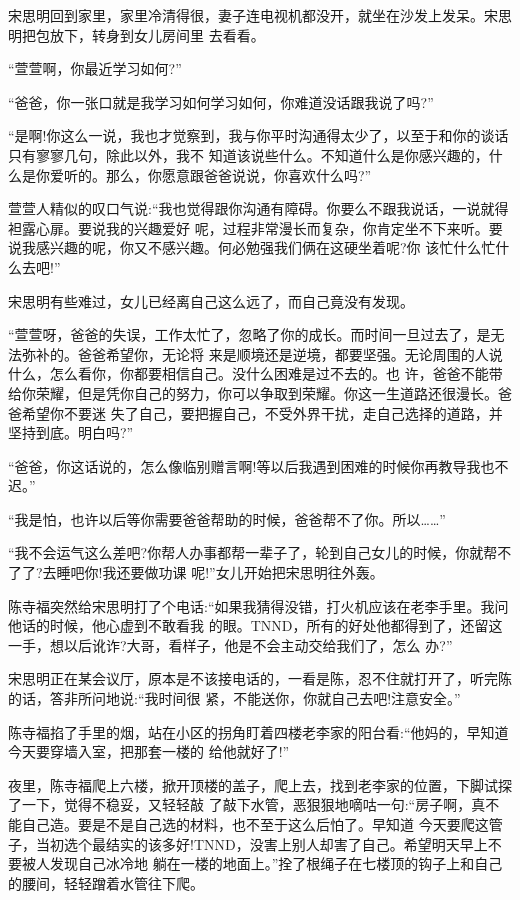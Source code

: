 \documentclass[11pt,a4paper,onecolumn]{article}
\begin{document}
宋思明回到家里，家里冷清得很，妻子连电视机都没开，就坐在沙发上发呆。宋思明把包放下，转身到女儿房间里
去看看。

``萱萱啊，你最近学习如何?''

``爸爸，你一张口就是我学习如何学习如何，你难道没话跟我说了吗?''

``是啊!你这么一说，我也才觉察到，我与你平时沟通得太少了，以至于和你的谈话只有寥寥几句，除此以外，我不
知道该说些什么。不知道什么是你感兴趣的，什么是你爱听的。那么，你愿意跟爸爸说说，你喜欢什么吗?''

萱萱人精似的叹口气说:``我也觉得跟你沟通有障碍。你要么不跟我说话，一说就得袒露心扉。要说我的兴趣爱好
呢，过程非常漫长而复杂，你肯定坐不下来听。要说我感兴趣的呢，你又不感兴趣。何必勉强我们俩在这硬坐着呢?你
该忙什么忙什么去吧!''

宋思明有些难过，女儿已经离自己这么远了，而自己竟没有发现。

``萱萱呀，爸爸的失误，工作太忙了，忽略了你的成长。而时间一旦过去了，是无法弥补的。爸爸希望你，无论将
来是顺境还是逆境，都要坚强。无论周围的人说什么，怎么看你，你都要相信自己。没什么困难是过不去的。也
许，爸爸不能带给你荣耀，但是凭你自己的努力，你可以争取到荣耀。你这一生道路还很漫长。爸爸希望你不要迷
失了自己，要把握自己，不受外界干扰，走自己选择的道路，并坚持到底。明白吗?''

``爸爸，你这话说的，怎么像临别赠言啊!等以后我遇到困难的时候你再教导我也不迟。''

``我是怕，也许以后等你需要爸爸帮助的时候，爸爸帮不了你。所以……''

``我不会运气这么差吧?你帮人办事都帮一辈子了，轮到自己女儿的时候，你就帮不了了?去睡吧你!我还要做功课
呢!''女儿开始把宋思明往外轰。

陈寺福突然给宋思明打了个电话:``如果我猜得没错，打火机应该在老李手里。我问他话的时候，他心虚到不敢看我
的眼。TNND，所有的好处他都得到了，还留这一手，想以后讹诈?大哥，看样子，他是不会主动交给我们了，怎么
办?''

宋思明正在某会议厅，原本是不该接电话的，一看是陈，忍不住就打开了，听完陈的话，答非所问地说:``我时间很
紧，不能送你，你就自己去吧!注意安全。''

陈寺福掐了手里的烟，站在小区的拐角盯着四楼老李家的阳台看:``他妈的，早知道今天要穿墙入室，把那套一楼的
给他就好了!''

夜里，陈寺福爬上六楼，掀开顶楼的盖子，爬上去，找到老李家的位置，下脚试探了一下，觉得不稳妥，又轻轻敲
了敲下水管，恶狠狠地嘀咕一句:``房子啊，真不能自己造。要是不是自己选的材料，也不至于这么后怕了。早知道
今天要爬这管子，当初选个最结实的该多好!TNND，没害上别人却害了自己。希望明天早上不要被人发现自己冰冷地
躺在一楼的地面上。''拴了根绳子在七楼顶的钩子上和自己的腰间，轻轻蹭着水管往下爬。
\end{document}
